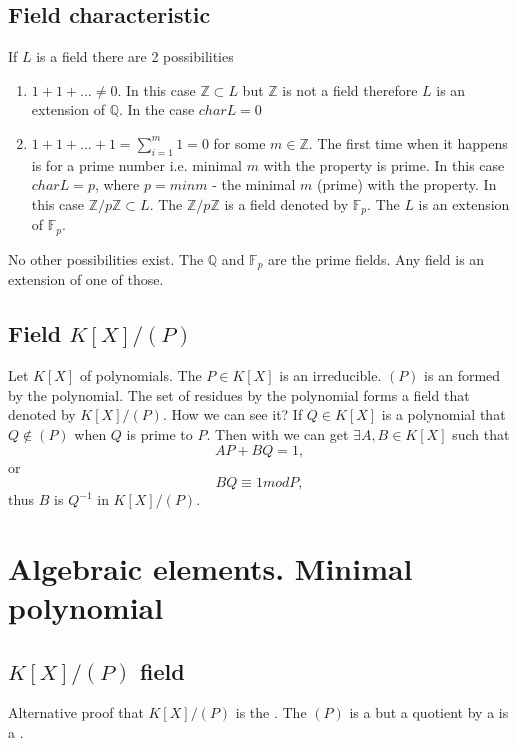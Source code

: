 \subsection{Field characteristic}
If $L$ is a field there are 2 possibilities
\begin{enumerate}
\item $1 + 1 + \dots \ne 0$. In this case
  $\mathbb{Z} \subset L$ but $\mathbb{Z}$ is not a field therefore $L$
  is an extension of $\mathbb{Q}$. In the case $char L = 0$
  \item $1 + 1 + \dots + 1 = \sum_{i = 1}^m 1 = 0$ for some $m \in
    \mathbb{Z}$. The first time when it happens is for a prime number
    i.e. minimal $m$ with the property is prime. In this case $char L
    = p$, where $p = min m$  - the minimal $m$ (prime) with the
    property. In this 
    case $\mathbb{Z}/p\mathbb{Z} \subset L$. The
    $\mathbb{Z}/p\mathbb{Z}$ is a field denoted by $\mathbb{F}_p$. The
    $L$ is an extension of $\mathbb{F}_p$.
\end{enumerate}
No other possibilities exist. The $\mathbb{Q}$ and $\mathbb{F}_p$ are
the prime fields. Any field is an extension of one of those.

\subsection{Field $K\left[X\right]/\left(P\right)$}
Let $K\left[X\right]$  of polynomials.
The $P \in K\left[X\right]$ is an irreducible. $\left(P\right)$ is an
 formed by the polynomial. The set of residues by
the polynomial forms a field that denoted by
$K\left[X\right]/\left(P\right)$. How we can see it?
If $Q \in K\left[X\right]$ is a polynomial that $Q \notin
\left(P\right)$ when $Q$ is prime to $P$. Then with
 we can get $\exists A, B \in K\left[X\right]$
such that
\[
A P + B Q = 1,
\]
or
\[
B Q \equiv 1 mod P,
\]
thus $B$ is $Q^{-1}$ in $K\left[X\right]/\left(P\right)$.


\section{Algebraic elements. Minimal polynomial}

\subsection{$K\left[X\right]/\left(P\right)$ field}

Alternative proof that $K\left[X\right]/\left(P\right)$ is the
. The $\left(P\right)$ is a 
but a quotient by a   is a .

